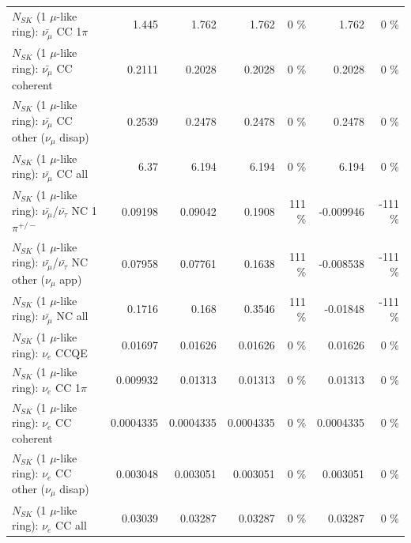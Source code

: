 \begin{table}
\begin{tabular}{| l | r | r | r  r | r  r |}
                         $N_{SK}$ (1 $\mu$-like ring): $\bar{\nu_\mu}$ CC 1$\pi$ &           1.445 &           1.762 &           1.762 &        0 \%  &           1.762 &        0 \%  \\ 
                       $N_{SK}$ (1 $\mu$-like ring): $\bar{\nu_\mu}$ CC coherent &          0.2111 &          0.2028 &          0.2028 &        0 \%  &          0.2028 &        0 \%  \\ 
        $N_{SK}$ (1 $\mu$-like ring): $\bar{\nu_\mu}$ CC other ($\nu_\mu$ disap) &          0.2539 &          0.2478 &          0.2478 &        0 \%  &          0.2478 &        0 \%  \\ 
                          $N_{SK}$ (1 $\mu$-like ring): $\bar{\nu_{\mu}}$ CC all &            6.37 &           6.194 &           6.194 &        0 \%  &           6.194 &        0 \%  \\ 
\hline
  $N_{SK}$ (1 $\mu$-like ring): $\bar{\nu_\mu}$/$\bar{\nu_\tau}$ NC 1$\pi^{+/-}$ &         0.09198 &         0.09042 &          0.1908 &      111 \%  &       -0.009946 &     -111 \%  \\ 
$N_{SK}$ (1 $\mu$-like ring): $\bar{\nu_\mu}$/$\bar{\nu_\tau}$ NC other ($\nu_\mu$ app) &         0.07958 &         0.07761 &          0.1638 &      111 \%  &       -0.008538 &     -111 \%  \\ 
                          $N_{SK}$ (1 $\mu$-like ring): $\bar{\nu_{\mu}}$ NC all &          0.1716 &           0.168 &          0.3546 &      111 \%  &        -0.01848 &     -111 \%  \\ 
\hline
\hline
\hline
                                      $N_{SK}$ (1 $\mu$-like ring): $\nu_e$ CCQE &         0.01697 &         0.01626 &         0.01626 &        0 \%  &         0.01626 &        0 \%  \\ 
                                 $N_{SK}$ (1 $\mu$-like ring): $\nu_e$ CC 1$\pi$ &        0.009932 &         0.01313 &         0.01313 &        0 \%  &         0.01313 &        0 \%  \\ 
                               $N_{SK}$ (1 $\mu$-like ring): $\nu_e$ CC coherent &       0.0004335 &       0.0004335 &       0.0004335 &        0 \%  &       0.0004335 &        0 \%  \\ 
                $N_{SK}$ (1 $\mu$-like ring): $\nu_e$ CC other ($\nu_\mu$ disap) &        0.003048 &        0.003051 &        0.003051 &        0 \%  &        0.003051 &        0 \%  \\ 
                                  $N_{SK}$ (1 $\mu$-like ring): $\nu_{e}$ CC all &         0.03039 &         0.03287 &         0.03287 &        0 \%  &         0.03287 &        0 \%  \\ 

\end{tabular}
\end{table}
